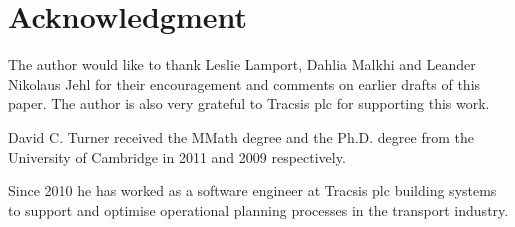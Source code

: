 \documentclass[journal]{IEEEtran}
\begin{document}
\section*{Acknowledgment}

The author would like to thank Leslie Lamport, Dahlia Malkhi and Leander
Nikolaus Jehl for their encouragement and comments on earlier drafts of this
paper. The author is also very grateful to Tracsis plc for supporting this
work.



\ifCLASSOPTIONcaptionsoff
  \newpage
\fi







%

% 

%
\ifCLASSOPTIONpeerreview
\else
\begin{IEEEbiographynophoto}{David C. Turner} received the MMath degree and the
Ph.D. degree from the University of Cambridge in 2011 and 2009 respectively.

Since 2010 he has worked as a software engineer at Tracsis plc building systems
to support and optimise operational planning processes in the transport
industry.

\end{IEEEbiographynophoto}
\fi
\end{document}

